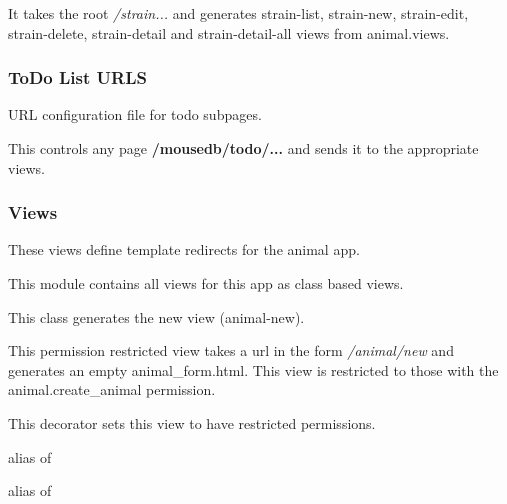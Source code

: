\documentclass[letterpaper,10pt,english]{sphinxmanual}
\begin{document}
It takes the root \emph{/strain...} and generates strain-list, strain-new, strain-edit, strain-delete, strain-detail and strain-detail-all views from animal.views.


\subsubsection{ToDo List URLS}
\label{animals:todo-list-urls}\label{animals:module-mousedb.animal.urls.todo}
URL configuration file for todo subpages.

This controls any page \textbf{/mousedb/todo/...} and sends it to the appropriate views.


\subsubsection{Views}
\label{animals:module-mousedb.animal.views}\label{animals:views}
These views define template redirects for the animal app.

This module contains all views for this app as class based views.

\begin{fulllineitems}
\label{animals:mousedb.animal.views.AnimalCreate}
This class generates the new {\hyperref[animals:mousedb.animal.models.Animal]{}} view (animal-new).

This permission restricted view takes a url in the form \emph{/animal/new} and generates an empty animal\_form.html.
This view is restricted to those with the animal.create\_animal permission.

\begin{fulllineitems}
\label{animals:mousedb.animal.views.AnimalCreate.dispatch}
This decorator sets this view to have restricted permissions.

\end{fulllineitems}


\begin{fulllineitems}
\label{animals:mousedb.animal.views.AnimalCreate.form_class}
alias of 

\end{fulllineitems}


\begin{fulllineitems}
\label{animals:mousedb.animal.views.AnimalCreate.model}
alias of 

\end{fulllineitems}


\end{fulllineitems}
\end{document}
